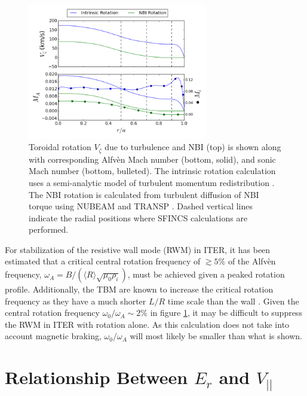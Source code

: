 \documentclass{article}
\begin{document}
\FloatBarrier

\begin{figure}[h!]
\centering
\includegraphics[width=0.7\textwidth]{rotationestimate.png}
\caption{\label{fig:rotation_estimate} Toroidal rotation $V_{\zeta}$ due to turbulence and NBI (top) is shown along with  corresponding Alfv\`{e}n Mach number (bottom, solid), and sonic Mach number (bottom, bulleted). The intrinsic rotation calculation uses a semi-analytic model of turbulent momentum redistribution \cite{Hillesheim2015}. The NBI rotation is calculated from turbulent diffusion of NBI torque using NUBEAM and TRANSP \cite{Poli2014}. Dashed vertical lines indicate the radial positions where SFINCS calculations are performed. }
\end{figure}

For stabilization of the resistive wall mode (RWM) in ITER, it has been estimated that a critical central rotation frequency of $\gtrsim5\%$ of the Alfv\`{e}n frequency, $\omega_A = B/(\langle R\rangle\sqrt{\mu_0 \rho_i})$, must be achieved given a peaked rotation profile. Additionally, the TBM are known to increase the critical rotation frequency as they have a much shorter $L/R$ time scale than the wall \cite{Liu2004}. Given the central rotation frequency $\omega_0/\omega_A \sim 2\%$ in figure \ref{fig:rotation_estimate}, it may be difficult to suppress the RWM in ITER with rotation alone. As this calculation does not take into account magnetic braking, $\omega_0/\omega_A$ will most likely be smaller than what is shown. 

\FloatBarrier

\section{Relationship Between $E_r$ and $V_{||}$}\label{Erandv}
\end{document}
